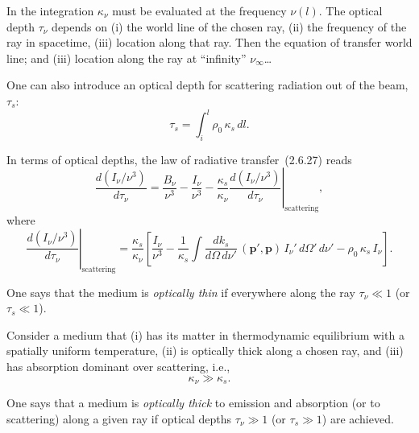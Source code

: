 In the integration $\kappa_\nu$ must be evaluated at the frequency
$\nu(l)$.  The optical depth $\tau_\nu$ depends on (i) the world line of
the chosen ray, (ii) the frequency of the ray in spacetime, (iii) location
along that ray.  Then the equation of transfer
world line; and (iii) location along the ray at ``infinity'' $\nu_\infty$\ldots

One can also introduce an optical depth for scattering radiation out of the
beam, $\tau_s$:
%
\begin{equation}
\tag{2.6.30}
\tau_s = \int_i^l \rho_0\,\kappa_s\,dl.
\end{equation}

In terms of optical depths, the law of radiative transfer~(2.6.27) reads
%
\begin{equation}
\tag{2.6.31}
\frac{d(I_\nu/\nu^3)}{d\tau_\nu}
= \frac{B_\nu}{\nu^3} - \frac{I_\nu}{\nu^3}
  - \frac{\kappa_s}{\kappa_\nu}
  \left.\frac{d(I_\nu/\nu^3)}{d\tau_\nu}\right|_{\text{scattering}},
\end{equation}
%
where
%
\begin{equation}
\tag{2.6.32}
\left.\frac{d(I_\nu/\nu^3)}{d\tau_\nu}\right|_{\text{scattering}}
= \frac{\kappa_s}{\kappa_\nu}\left[\frac{I_\nu}{\nu^3} - \frac{1}{\kappa_s}
  \int \frac{dk_s}{d\Omega\,d\nu'}\,
  (\mathbf{p}',\mathbf{p})\,I_\nu'\,d\Omega'\,d\nu'
  - \rho_0\,\kappa_s\,I_\nu \right].
\end{equation}


One says that the medium is \emph{optically thin} if everywhere along
the ray $\tau_\nu \ll 1$ (or $\tau_s \ll 1$).

Consider a medium that (i) has its matter in thermodynamic equilibrium with
a spatially uniform temperature, (ii) is optically thick along a chosen ray, and
(iii) has absorption dominant over scattering, i.e.,
%
\begin{equation}
\tag{2.6.33}
\kappa_\nu \gg \kappa_s.
\end{equation}

One says that a medium is \emph{optically thick} to emission and absorption (or to
scattering) along a given ray if optical depths $\tau_\nu \gg 1$
(or $\tau_s \gg 1$) are achieved.


